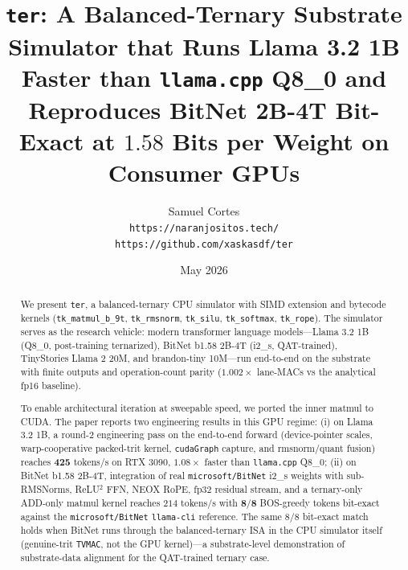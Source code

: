 \documentclass{article}
\title{\texttt{ter}: A Balanced-Ternary Substrate Simulator that
       Runs Llama 3.2 1B Faster than \texttt{llama.cpp} {Q8\_0}
       and Reproduces BitNet 2B-4T Bit-Exact at $1.58$ Bits per
       Weight on Consumer {GPUs}}
\author{
  Samuel Cortes \\
  \texttt{https://naranjositos.tech/} \\
  \texttt{https://github.com/xaskasdf/ter}
}
\date{May 2026}
\begin{document}
\maketitle

\begin{abstract}
We present \texttt{ter}, a balanced-ternary {CPU} simulator with {SIMD}
extension and bytecode kernels (\texttt{tk\_matmul\_b\_9t},
\texttt{tk\_rmsnorm}, \texttt{tk\_silu}, \texttt{tk\_softmax},
\texttt{tk\_rope}). The simulator serves as the research vehicle:
modern transformer language models---Llama 3.2 1B (Q8\_0, post-training
ternarized), BitNet b1.58 2B-4T (i2\_s, {QAT}-trained), TinyStories
Llama 2 20M, and brandon-tiny 10M---run end-to-end on the substrate
with finite outputs and operation-count parity ($1.002\times$
lane-MACs vs the analytical fp16 baseline).

To enable architectural iteration at sweepable speed, we ported the
inner matmul to {CUDA}. The paper reports two engineering results
in this {GPU} regime: (i) on Llama 3.2 1B, a round-2 engineering pass
on the end-to-end forward (device-pointer scales, warp-cooperative
packed-trit kernel, \texttt{cudaGraph} capture, and rmsnorm/quant
fusion) reaches $\mathbf{425}$ tokens/s on {RTX 3090},
$\mathbf{1.08\times}$ faster than \texttt{llama.cpp} {Q8\_0}; (ii) on
BitNet b1.58 2B-4T, integration of real \texttt{microsoft/BitNet}
i2\_s weights with sub-{RMSNorm}s, {ReLU}$^2$ {FFN}, {NEOX} {RoPE},
fp32 residual stream, and a ternary-only {ADD}-only matmul kernel
reaches $214$ tokens/s with $\mathbf{8/8}$ {BOS}-greedy tokens
bit-exact against the \texttt{microsoft/BitNet} \texttt{llama-cli}
reference. The same $8/8$ bit-exact match holds when BitNet runs
through the balanced-ternary {ISA} in the {CPU} simulator itself
(genuine-trit \texttt{TVMAC}, not the {GPU} kernel)---a substrate-level
demonstration of substrate-data alignment for the {QAT}-trained ternary
case.


\end{abstract}
\end{document}
